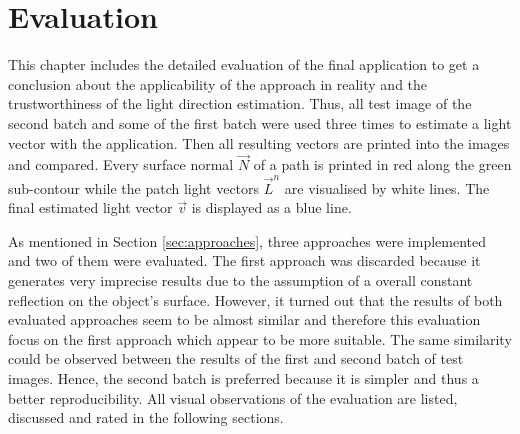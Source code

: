 \section{Evaluation} \label{sec:Evaluation}
This chapter includes the detailed evaluation of the final application to get a conclusion about the applicability of the approach in reality and the trustworthiness of the light direction estimation. Thus, all test image of the second batch and some of the first batch were used three times to estimate a light vector with the application. Then all resulting vectors are printed into the images and compared. Every surface normal $\vec{N}$ of a path is printed in red along the green sub-contour while the patch light vectors $\vec{L}^n$ are visualised by white lines. The final estimated light vector $\vec{v}$ is displayed as a blue line. 

As mentioned in Section \ref{sec:approaches}, three approaches were implemented and two of them were evaluated. The first approach was discarded because it generates very imprecise results due to the assumption of a overall constant reflection on the object's surface. However, it turned out that the results of both evaluated approaches seem to be almost similar and therefore this evaluation focus on the first approach which appear to be more suitable. The same similarity could be observed between the results of the first and second batch of test images. Hence, the second batch is preferred because it is simpler and thus a better reproducibility. All visual observations of the evaluation are listed, discussed and rated in the following sections.

